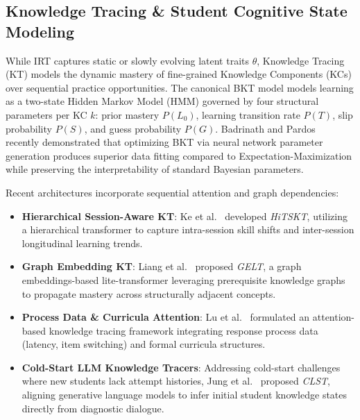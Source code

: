 \documentclass[conference]{IEEEtran}
\begin{document}
\subsection{Knowledge Tracing \& Student Cognitive State Modeling}
While IRT captures static or slowly evolving latent traits $\theta$, Knowledge Tracing (KT) models the dynamic mastery of fine-grained Knowledge Components (KCs) over sequential practice opportunities. The canonical BKT model \cite{CorbettAnderson1995} models learning as a two-state Hidden Markov Model (HMM) governed by four structural parameters per KC $k$: prior mastery $P(L_0)$, learning transition rate $P(T)$, slip probability $P(S)$, and guess probability $P(G)$. Badrinath and Pardos~\cite{BadrinathPardos2025} recently demonstrated that optimizing BKT via neural network parameter generation produces superior data fitting compared to Expectation-Maximization while preserving the interpretability of standard Bayesian parameters.

Recent architectures incorporate sequential attention and graph dependencies:
\begin{itemize}[leftmargin=*]
    \item \textbf{Hierarchical Session-Aware KT}: Ke et al.~\cite{Ke2024} developed \textit{HiTSKT}, utilizing a hierarchical transformer to capture intra-session skill shifts and inter-session longitudinal learning trends.
    \item \textbf{Graph Embedding KT}: Liang et al.~\cite{Liang2024} proposed \textit{GELT}, a graph embeddings-based lite-transformer leveraging prerequisite knowledge graphs to propagate mastery across structurally adjacent concepts.
    \item \textbf{Process Data \& Curricula Attention}: Lu et al.~\cite{Lu2024} formulated an attention-based knowledge tracing framework integrating response process data (latency, item switching) and formal curricula structures.
    \item \textbf{Cold-Start LLM Knowledge Tracers}: Addressing cold-start challenges where new students lack attempt histories, Jung et al.~\cite{Jung2025} proposed \textit{CLST}, aligning generative language models to infer initial student knowledge states directly from diagnostic dialogue.
\end{itemize}
\end{document}
